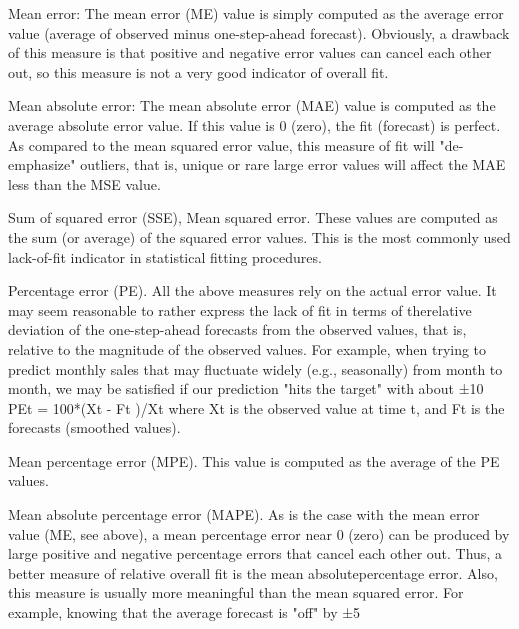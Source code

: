 Mean error: The mean error (ME) value is simply computed as the average error value (average of observed minus one-step-ahead forecast). Obviously, a drawback of this measure is that positive and negative error values can cancel each other out, so this measure is not a very good indicator of overall fit.

Mean absolute error: The mean absolute error (MAE) value is computed as the average absolute error value. If this value is 0 (zero), the fit (forecast) is perfect. As compared to the mean squared error value, this measure of fit will "de-emphasize" outliers, that is, unique or rare large error values will affect the MAE less than the MSE value.

Sum of squared error (SSE), Mean squared error. These values are computed as the sum (or average) of the squared error values. This is the most commonly used lack-of-fit indicator in statistical fitting procedures.

Percentage error (PE). All the above measures rely on the actual error value. It may seem reasonable to rather express the lack of fit in terms of therelative deviation of the one-step-ahead forecasts from the observed values, that is, relative to the magnitude of the observed values. For example, when trying to predict monthly sales that may fluctuate widely (e.g., seasonally) from month to month, we may be satisfied if our prediction "hits the target" with about ±10%
PEt = 100*(Xt - Ft )/Xt
where Xt is the observed value at time t, and Ft is the forecasts (smoothed values).

Mean percentage error (MPE). This value is computed as the average of the PE values.

Mean absolute percentage error (MAPE). As is the case with the mean error value (ME, see above), a mean percentage error near 0 (zero) can be produced by large positive and negative percentage errors that cancel each other out. Thus, a better measure of relative overall fit is the mean absolutepercentage error. Also, this measure is usually more meaningful than the mean squared error. For example, knowing that the average forecast is "off" by ±5%

